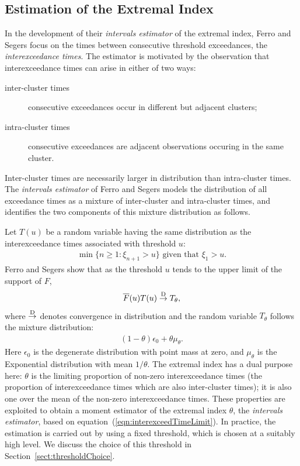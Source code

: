 \documentclass[10pt]{article}\usepackage[]{graphicx}\usepackage[]{color}
\begin{document}
\subsection{Estimation of the Extremal Index}
\label{sect:estEI}
%
In the development of their {\it intervals estimator} of the extremal index, Ferro and Segers focus on the times between consecutive threshold exceedances, the \emph{interexceedance times}.  The estimator is motivated by the observation that interexceedance times can arise in either of two ways:
\begin{description}
\item[inter-cluster times] consecutive exceedances occur in different but adjacent clusters;
\item[intra-cluster times] consecutive exceedances are adjacent observations occuring in the same cluster.
\end{description}
Inter-cluster times are necessarily larger in distribution than intra-cluster times.  The \emph{intervals estimator} of Ferro and Segers models the distribution of all exceedance times as a mixture of inter-cluster and intra-cluster times, and identifies the two components of this mixture distribution as follows.

Let $T(u)$ be a random variable having the same distribution as the interexceedance times associated with threshold $u$:
\begin{eqnarray*}
  \min\{n\geq1: \xi_{n+1}>u\} \mbox{ given that } \xi_1>u.
\end{eqnarray*}
Ferro and Segers show that as the threshold $u$ tends to the upper limit of the support of $F$,
\begin{eqnarray}\label{eqn:interexceedTimeLimit}
\overline F(u) T(u) \stackrel{\rm D}{\rightarrow} T_\theta,
\end{eqnarray}
where $\stackrel{\rm D}{\rightarrow}$ denotes convergence in distribution and the random variable $T_\theta$ follows the mixture distribution:
\begin{eqnarray*}
 (1-\theta) \epsilon_0 + \theta \mu_\theta.
\end{eqnarray*}
Here $\epsilon_0$ is the degenerate distribution with point mass at zero, and $\mu_\theta$ is the Exponential distribution with mean $1/\theta$.  The extremal index has a dual purpose here: $\theta$ is the limiting proportion of non-zero interexceedance times (the proportion of interexceedance times which are also inter-cluster times); it is also one over the mean of the non-zero interexceedance times.  These properties are exploited to obtain a moment estimator of the extremal index $\theta$, the \emph{intervals estimator}, based on equation~(\ref{eqn:interexceedTimeLimit}).  In practice, the estimation is carried out by using a fixed threshold, which is chosen at a suitably high level.  We discuss the choice of this threshold in Section~\ref{sect:thresholdChoice}.
%
\end{document}
